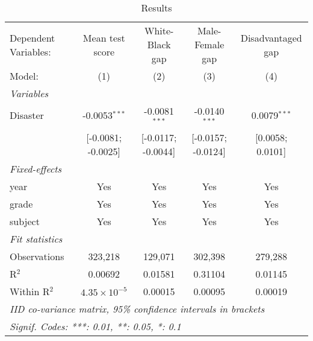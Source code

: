 
\begin{table}[htbp]
   \centering
   \caption{\label{MainResults} Results}
   \begin{tabular}{lcccc}
      \tabularnewline\midrule\midrule
      Dependent Variables: & Mean test score       & White-Black gap    & Male-Female gap    & Disadvantaged gap\\
      Model:               & (1)                   & (2)                & (3)                & (4)\\
      \midrule \emph{Variables} &   &   &   &  \\
      Disaster             & -0.0053$^{***}$       & -0.0081$^{***}$    & -0.0140$^{***}$    & 0.0079$^{***}$\\
                           & [-0.0081; -0.0025]    & [-0.0117; -0.0044] & [-0.0157; -0.0124] & [0.0058; 0.0101]\\
      \midrule \emph{Fixed-effects} &   &   &   &  \\
      year                 & Yes                   & Yes                & Yes                & Yes\\
      grade                & Yes                   & Yes                & Yes                & Yes\\
      subject              & Yes                   & Yes                & Yes                & Yes\\
      \midrule \emph{Fit statistics} &   &   &   &  \\
      Observations         & 323,218               & 129,071            & 302,398            & 279,288\\
      R$^2$                & 0.00692               & 0.01581            & 0.31104            & 0.01145\\
      Within R$^2$         & $4.35\times 10^{-5}$ & 0.00015            & 0.00095            & 0.00019\\
      \midrule\midrule\multicolumn{5}{l}{\emph{IID co-variance matrix, 95\% confidence intervals in brackets}}\\
      \multicolumn{5}{l}{\emph{Signif. Codes: ***: 0.01, **: 0.05, *: 0.1}}\\
   \end{tabular}
\end{table}


